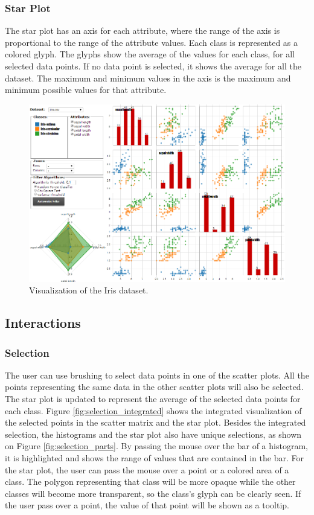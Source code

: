 \documentclass[journal]{IEEEtran}
\begin{document}
\subsubsection{Star Plot}
The star plot has an axis for each attribute, where the range of the axis is proportional to the range of the attribute values. Each class is represented as a colored glyph. The glyphs show the average of the values for each class, for all selected data points. If no data point is selected, it shows the average for all the dataset. The maximum and minimum values in the axis is the maximum and minimum  possible values for that attribute.

\begin{figure}[!t]
  \centering
  \captionsetup{justification=centering}
  \includegraphics[width=5.0in]{images/overview2}
  \caption{Visualization of the Iris dataset.}
  \label{fig:overview2}
\end{figure}

\subsection{Interactions}

\subsubsection{Selection}
The user can use brushing to select data points in one of the scatter plots. All the points representing the same data in the other scatter plots will also be selected. The star plot is updated to represent the average of the selected data points for each class. Figure \ref{fig:selection_integrated} shows the integrated visualization of the selected points in the scatter matrix and the star plot. Besides the integrated selection, the histograms and the star plot also have unique selections, as shown on Figure \ref{fig:selection_parts}. By passing the mouse over the bar of a histogram, it is highlighted and shows the range of values that are contained in the bar. For the star plot, the user can pass the mouse over a point or a colored area of a class. The polygon representing that class will be more opaque while the other classes will become more transparent, so the class's glyph can be clearly seen. If the user pass over a point, the value of that point will be shown as a tooltip.
\end{document}
